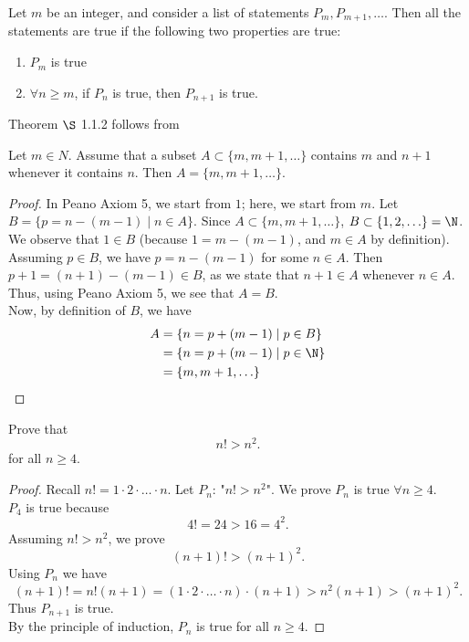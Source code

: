 \documentclass[math1010-lecture-notes]{subfiles}
\begin{document}
 \begin{theorem}{}
   Let $m$ be an integer, and consider a list of statements $P_m,P_{m+1},\ldots$. Then all the
   statements are true if the following two properties are true:
   \begin{enumerate}
     \item $P_m$ is true
     \item  $\forall n\ge m$, if $P_n$ is true, then  $P_{n+1}$ is true.
   \end{enumerate}
\end{theorem}
Theorem $\S$ 1.1.2 follows from
\begin{proposition}{}
  Let $m\in N$. Assume that a subset  $A\subset \{m, m+1, \ldots\} $ contains $m$ and $n+1$ whenever
  it contains $n$. Then $A=\{ m,m+1,\ldots \}$.
\end{proposition}
\begin{proof}[Proof]
  In Peano Axiom 5, we start from $ 1$; here, we start from $m$. Let $B=\{p=n-(m-1)\mid n\in A\} $.
  Since $A\subset \{ m,m+1,\ldots \}$, $B\subset \{1, 2, \ldots\}=\N$. \\
  We observe that $1\in B$ (because $1=m-(m-1)$, and $m\in A$ by definition). Assuming $p\in B$, we
  have $p=n-(m-1)$ for some $n\in A$. Then $p+1=(n+1)-(m-1)\in B$, as we state that $n+1\in A$
  whenever $n\in A$. Thus, using Peano Axiom 5, we see that $A=B$. \\
  Now, by definition of $B$, we have
  \begin{align*}
    A &= \{n = p + \left( m-1 \right) \mid p \in B \}  \\
      &=  \{n=p+\left( m-1 \right) \mid p \in \N\} \\
      &=  \{m, m+1, \ldots\}  \\
  \end{align*}
\end{proof}




\begin{example}
  Prove that \[
  n! > n^2
  .\] for all $n\ge 4$.
\end{example}
\begin{proof}[Proof]
  Recall $n! = 1\cdot 2\cdot \ldots\cdot n$. Let $P_n$: "$n! > n^2$". We prove $P_n$ is true
  $\forall n\ge 4$.\\
  $P_4$ is true because  \[
  4! = 24 > 16 = 4^2
  .\] Assuming $n! > n^2$, we prove \[
  \left( n+1 \right)! > \left( n+1 \right) ^2
  .\] Using $P_n$ we have  \[
  \left( n+1 \right)! = n!\left( n+1 \right) = \left( 1\cdot 2\cdot \ldots\cdot n \right) \cdot \left( n+1 \right) > n^2(n+1) > \left( n+1 \right) ^2
.\] Thus $P_{n+1}$ is true. \\
By the principle of induction, $P_n$ is true for all  $n\ge 4$.
\end{proof} 
\end{document}
